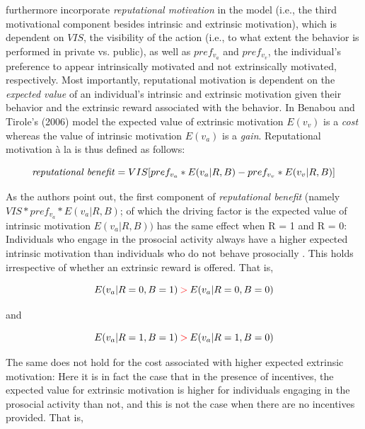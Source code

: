 \documentclass[AER]{AEA}
\begin{document}
\cite{benabou_incentives_2006} furthermore incorporate \textit{reputational motivation} in the model (i.e., the third motivational component besides intrinsic and extrinsic motivation), which is dependent on $VIS$, the visibility of the action (i.e., to what extent the behavior is performed in private vs. public), as well as $pref_{v_{a}}$ and $pref_{v_{v}}$, the individual’s preference to appear intrinsically motivated and not extrinsically motivated, respectively. Most importantly, reputational motivation is dependent on the \textit{expected value} of an individual’s intrinsic and extrinsic motivation given their behavior and the extrinsic reward associated with the behavior. In Benabou and Tirole’s (2006) model the expected value of extrinsic motivation $E(v_{v})$ is a \textit{cost} whereas the value of intrinsic motivation $E(v_{a})$ is a \textit{gain}. Reputational motivation à la \cite{benabou_incentives_2006} is thus defined as follows:

\begin{equation} 
 \mbox{\textit{reputational benefit}} =  VIS[pref_{v_{a}} * E(v_{a} | R, B) - pref_{v_{v}} * E(v_{v} | R, B)]
\end{equation}


As the authors point out, the first component of \textit{reputational benefit} (namely $VIS * pref_{v_{a}} * E(v_{a} | R, B)$; of which the driving factor is the expected value of intrinsic motivation $E(v_{a} | R, B))$ has the same effect when R = 1 and R = 0: Individuals who engage in the prosocial activity always have a higher expected intrinsic motivation than individuals who do not behave prosocially \citep{benabou_incentives_2006}. This holds irrespective of whether an extrinsic reward is offered. That is,

\begin{equation} 
 E(v_{a} | R = 0, B = 1) \mathbin{\color{red}>} E(v_{a} | R = 0, B = 0)
\end{equation}
\centerline{and}
\begin{equation} 
 E(v_{a} | R = 1, B = 1) \mathbin{\color{red}>} E(v_{a} | R = 1, B = 0)
\end{equation}


The same does not hold for the cost associated with higher expected extrinsic motivation: Here it is in fact the case that in the presence of incentives, the expected value for extrinsic motivation is higher for individuals engaging in the prosocial activity than not, and this is not the case when there are no incentives provided. That is,
\end{document}
